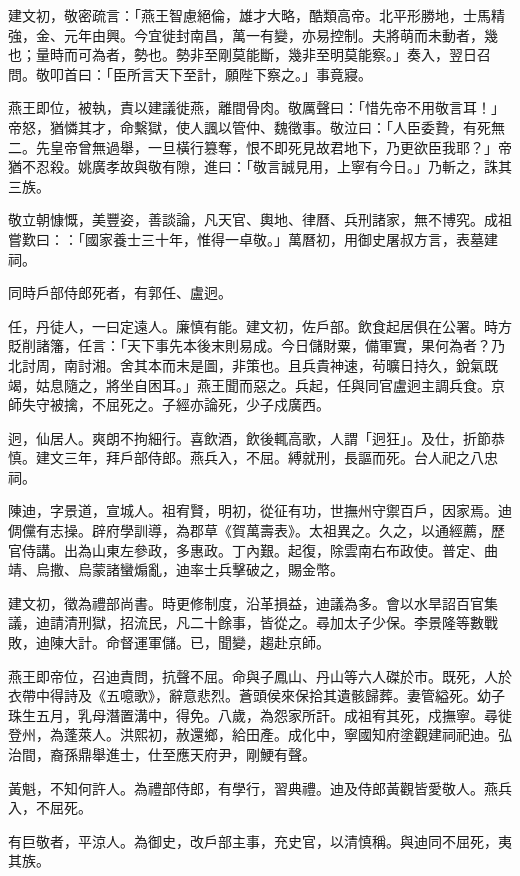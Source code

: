 \begin{pinyinscope}
建文初，敬密疏言：「燕王智慮絕倫，雄才大略，酷類高帝。北平形勝地，士馬精強，金、元年由興。今宜徙封南昌，萬一有變，亦易控制。夫將萌而未動者，幾也；量時而可為者，勢也。勢非至剛莫能斷，幾非至明莫能察。」奏入，翌日召問。敬叩首曰：「臣所言天下至計，願陛下察之。」事竟寢。

燕王即位，被執，責以建議徙燕，離間骨肉。敬厲聲曰：「惜先帝不用敬言耳！」帝怒，猶憐其才，命繫獄，使人諷以管仲、魏徵事。敬泣曰：「人臣委贄，有死無二。先皇帝曾無過舉，一旦橫行篡奪，恨不即死見故君地下，乃更欲臣我耶？」帝猶不忍殺。姚廣孝故與敬有隙，進曰：「敬言誠見用，上寧有今日。」乃斬之，誅其三族。

敬立朝慷慨，美豐姿，善談論，凡天官、輿地、律曆、兵刑諸家，無不博究。成祖嘗歎曰：：「國家養士三十年，惟得一卓敬。」萬曆初，用御史屠叔方言，表墓建祠。

同時戶部侍郎死者，有郭任、盧迥。

任，丹徒人，一曰定遠人。廉慎有能。建文初，佐戶部。飲食起居俱在公署。時方貶削諸籓，任言：「天下事先本後末則易成。今日儲財粟，備軍實，果何為者？乃北討周，南討湘。舍其本而末是圖，非策也。且兵貴神速，茍曠日持久，銳氣既竭，姑息隨之，將坐自困耳。」燕王聞而惡之。兵起，任與同官盧迥主調兵食。京師失守被擒，不屈死之。子經亦論死，少子戍廣西。

迥，仙居人。爽朗不拘細行。喜飲酒，飲後輒高歌，人謂「迥狂」。及仕，折節恭慎。建文三年，拜戶部侍郎。燕兵入，不屈。縛就刑，長謳而死。台人祀之八忠祠。

陳迪，字景道，宣城人。祖宥賢，明初，從征有功，世撫州守禦百戶，因家焉。迪倜儻有志操。辟府學訓導，為郡草《賀萬壽表》。太祖異之。久之，以通經薦，歷官侍講。出為山東左參政，多惠政。丁內艱。起復，除雲南右布政使。普定、曲靖、烏撒、烏蒙諸蠻煽亂，迪率士兵擊破之，賜金幣。

建文初，徵為禮部尚書。時更修制度，沿革損益，迪議為多。會以水旱詔百官集議，迪請清刑獄，招流民，凡二十餘事，皆從之。尋加太子少保。李景隆等數戰敗，迪陳大計。命督運軍儲。已，聞變，趨赴京師。

燕王即帝位，召迪責問，抗聲不屈。命與子鳳山、丹山等六人磔於市。既死，人於衣帶中得詩及《五噫歌》，辭意悲烈。蒼頭侯來保拾其遺骸歸葬。妻管縊死。幼子珠生五月，乳母潛置溝中，得免。八歲，為怨家所訐。成祖宥其死，戍撫寧。尋徙登州，為蓬萊人。洪熙初，赦還鄉，給田產。成化中，寧國知府塗觀建祠祀迪。弘治間，裔孫鼎舉進士，仕至應天府尹，剛鯁有聲。

黃魁，不知何許人。為禮部侍郎，有學行，習典禮。迪及侍郎黃觀皆愛敬人。燕兵入，不屈死。

有巨敬者，平涼人。為御史，改戶部主事，充史官，以清慎稱。與迪同不屈死，夷其族。


\end{pinyinscope}
